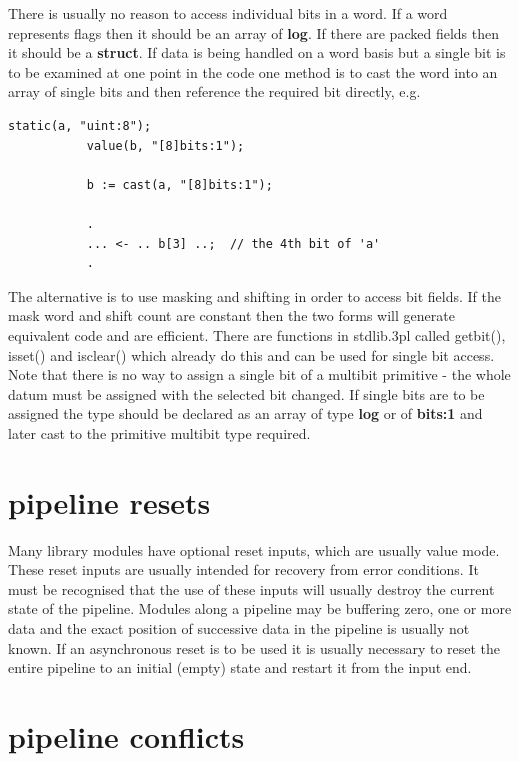         There is usually no reason to access individual bits in a word. If a
        word represents flags then it should be an array of {\bf log}. If
        there are packed fields then it should be a {\bf struct}. If data is
        being handled on a word basis but a single bit is to be examined at
        one point in the code one method is to cast the word into an
        array of single bits and then reference the required bit directly,
        e.g.
        \begin{lstlisting}[gobble=8, language=threepl]
           static(a, "uint:8");
           value(b, "[8]bits:1");

           b := cast(a, "[8]bits:1");

           .
           ... <- .. b[3] ..;  // the 4th bit of 'a'
           .
        \end{lstlisting}
        The alternative is to use masking and shifting in order to access bit
        fields. If the mask word and shift count are constant then the two forms
        will generate equivalent code and are efficient. There are functions in
        stdlib.3pl called getbit(), isset() and isclear() which already do this
        and can be used for single bit access. Note that there is no way to
        assign a single bit of a multibit primitive - the whole datum must be
        assigned with the selected bit changed. If single bits are to be
        assigned the type should be declared as an array of type {\bf log} or of
        {\bf bits:1} and later cast to the primitive multibit type required.
    
    \section{pipeline resets}

        Many library modules have optional reset inputs, which are usually
        value mode. These reset inputs are usually intended for recovery from
        error conditions. It must be recognised that the use of these inputs
        will usually destroy the current state of the pipeline. Modules along
        a pipeline may be buffering zero, one or more data and the exact
        position of successive data in the pipeline is usually not known. If
        an asynchronous reset is to be used it is usually necessary to reset
        the entire pipeline to an initial (empty) state and restart it from
        the input end.



    \section{pipeline conflicts}

